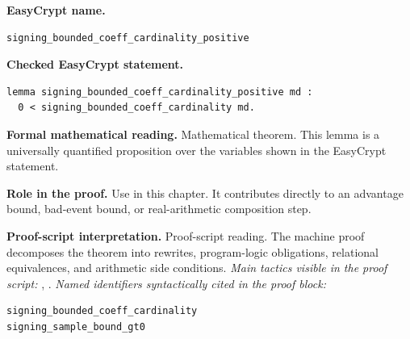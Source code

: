 \begin{formaltheorem}
\noindent\textbf{EasyCrypt name.}
\begin{lstlisting}[language=EasyCrypt,basicstyle=\ttfamily\scriptsize]
signing_bounded_coeff_cardinality_positive
\end{lstlisting}
\noindent\textbf{Checked EasyCrypt statement.}
\begin{lstlisting}[language=EasyCrypt,basicstyle=\ttfamily\scriptsize]
lemma signing_bounded_coeff_cardinality_positive md :
  0 < signing_bounded_coeff_cardinality md.
\end{lstlisting}
\noindent\textbf{Formal mathematical reading.}
Mathematical theorem. This lemma is a universally quantified proposition over the variables shown in the EasyCrypt statement.

\noindent\textbf{Role in the proof.}
Use in this chapter. It contributes directly to an advantage bound, bad-event bound, or real-arithmetic composition step.

\noindent\textbf{Proof-script interpretation.}
Proof-script reading. The machine proof decomposes the theorem into rewrites, program-logic obligations, relational equivalences, and arithmetic side conditions.
\emph{Main tactics visible in the proof script:} , .
\emph{Named identifiers syntactically cited in the proof block:}
\begin{lstlisting}[language=EasyCrypt,basicstyle=\ttfamily\scriptsize]
signing_bounded_coeff_cardinality
signing_sample_bound_gt0
\end{lstlisting}

\end{formaltheorem}

